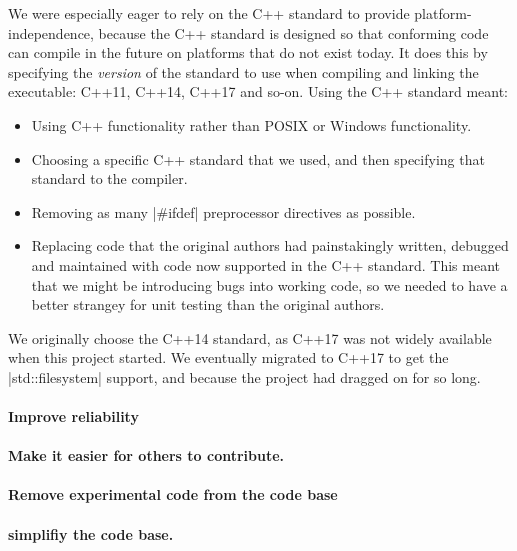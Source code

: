 \documentclass[5p]{elsarticle}
\begin{document}
We were especially eager to rely on the C++ standard to provide platform-independence, because the
C++ standard is designed so that conforming code can compile in the
future on platforms that do not exist today. It does this by
specifying the \emph{version} of the standard to use when compiling
and linking the executable: C++11, C++14, C++17 and so-on. Using the
C++ standard meant:

\begin{itemize}

\item Using C++ functionality rather than POSIX or Windows functionality.

\item Choosing a specific C++ standard that we used, and then specifying that standard to the compiler.

\item Removing as many |#ifdef| preprocessor directives as possible.

\item Replacing code that the original authors had painstakingly written, debugged and
maintained with code now supported in the C++ standard. This meant
that we might be introducing bugs into working code, so we needed to
have a better strangey for unit testing than the original authors.

\end{itemize}

We originally choose the C++14 standard, as C++17 was not widely
available when this project started. We eventually migrated to C++17 to get the
|std::filesystem| support, and because the project had dragged on for
so long.

\paragraph{Improve reliability}

\paragraph{Make it easier for others to contribute.}

\paragraph{Remove experimental code from the code base}

\paragraph{simplifiy the code base.}
\end{document}
